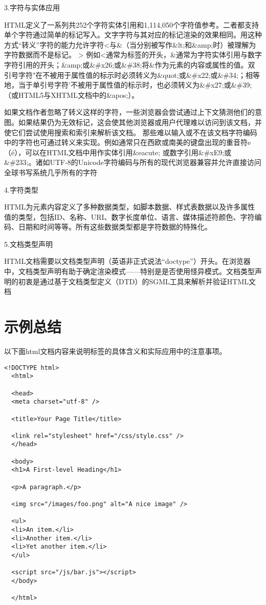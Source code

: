 \documentclass[
]{article}
\begin{document}
3.字符与实体应用

HTML定义了一系列共252个字符实体引用和1,114,050个字符值参考。二者都支持单个字符通过简单的标记写入。文字字符与其对应的标记渲染的效果相同。用这种方式``转义''字符的能力允许字符\textless 与\&（当分别被写作\&lt;和\&amp;时）被理解为字符数据而不是标记。
\textgreater{}
例如\textless 通常为标签的开头，\&通常为字符实体引用与数字字符引用的开头；\&amp;或\&\#x26;或\&\#38;将\&作为元素的内容或属性的值。双引号字符"在不被用于属性值的标示时必须转义为\&quot;或\&\#x22;或\&\#34;；相等地，当于单引号字符'不被用于属性值的标示时，也必须转义为\&\#x27;或\&\#39;（或HTML5与XHTML文档中的\&apos;）。

如果文档作者忽略了转义这样的字符，一些浏览器会尝试通过上下文猜测他们的意图。如果结果仍为无效标记，这会使其他浏览器或用户代理难以访问到该文档，并使它们尝试使用搜索和索引来解析该文档。
那些难以输入或不在该文档字符编码中的字符也可通过转义来实现。例如通常只在西欧或南美的键盘出现的重音符e（é），可以在HTML文档中用作实体引用\&eacute;
或数字引用\&\#xE9;或\&\#233;。诸如UTF-8的Unicode字符编码与所有的现代浏览器兼容并允许直接访问全球书写系统几乎所有的字符

4.字符类型

HTML为元素内容定义了多种数据类型，如脚本数据、样式表数据以及许多属性值的类型，包括ID、名称、URI、数字长度单位、语言、媒体描述符颜色、字符编码、日期和时间等等。所有这些数据类型都是字符数据的特殊化。

5.文档类型声明

HTML文档需要以文档类型声明（英语非正式说法``doctype''）开头。在浏览器中，文档类型声明有助于确定渲染模式------特别是是否使用怪异模式。文档类型声明的初衷是通过基于文档类型定义（DTD）的SGML工具来解析并验证HTML文档

\hypertarget{ux793aux4f8bux603bux7ed3}{%
\section{示例总结}\label{ux793aux4f8bux603bux7ed3}}

以下面html文档内容来说明标签的具体含义和实际应用中的注意事项。

\begin{verbatim}
<!DOCTYPE html>
  <html>
  
  <head>
  <meta charset="utf-8" />
  
  <title>Your Page Title</title>
  
  <link rel="stylesheet" href="/css/style.css" />
  </head>
  
  <body>
  <h1>A First-level Heading</h1>
  
  <p>A paragraph.</p>
  
  <img src="/images/foo.png" alt="A nice image" />
  
  <ul>
  <li>An item.</li>
  <li>Another item.</li>
  <li>Yet another item.</li>
  </ul>
  
  <script src="/js/bar.js"></script>
  </body>
  
  </html>
\end{verbatim}
\end{document}
